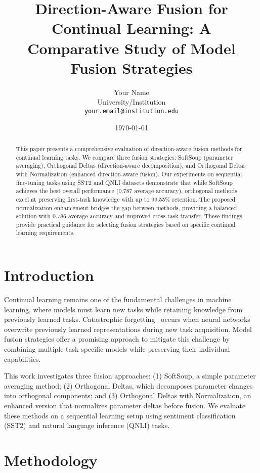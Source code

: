 \documentclass[11pt,a4paper]{article}
\title{Direction-Aware Fusion for Continual Learning: A Comparative Study of Model Fusion Strategies}
\author{Your Name\\
University/Institution\\
\texttt{your.email@institution.edu}}
\date{\today}
\begin{document}
\maketitle

\begin{abstract}
This paper presents a comprehensive evaluation of direction-aware fusion methods for continual learning tasks. We compare three fusion strategies: SoftSoup (parameter averaging), Orthogonal Deltas (direction-aware decomposition), and Orthogonal Deltas with Normalization (enhanced direction-aware fusion). Our experiments on sequential fine-tuning tasks using SST2 and QNLI datasets demonstrate that while SoftSoup achieves the best overall performance (0.787 average accuracy), orthogonal methods excel at preserving first-task knowledge with up to 99.55\% retention. The proposed normalization enhancement bridges the gap between methods, providing a balanced solution with 0.786 average accuracy and improved cross-task transfer. These findings provide practical guidance for selecting fusion strategies based on specific continual learning requirements.
\end{abstract}

\section{Introduction}

Continual learning remains one of the fundamental challenges in machine learning, where models must learn new tasks while retaining knowledge from previously learned tasks. Catastrophic forgetting~\cite{mccloskey1989catastrophic} occurs when neural networks overwrite previously learned representations during new task acquisition. Model fusion strategies offer a promising approach to mitigate this challenge by combining multiple task-specific models while preserving their individual capabilities.

This work investigates three fusion approaches: (1) SoftSoup, a simple parameter averaging method; (2) Orthogonal Deltas, which decomposes parameter changes into orthogonal components; and (3) Orthogonal Deltas with Normalization, an enhanced version that normalizes parameter deltas before fusion. We evaluate these methods on a sequential learning setup using sentiment classification (SST2) and natural language inference (QNLI) tasks.

\section{Methodology}
\end{document}
